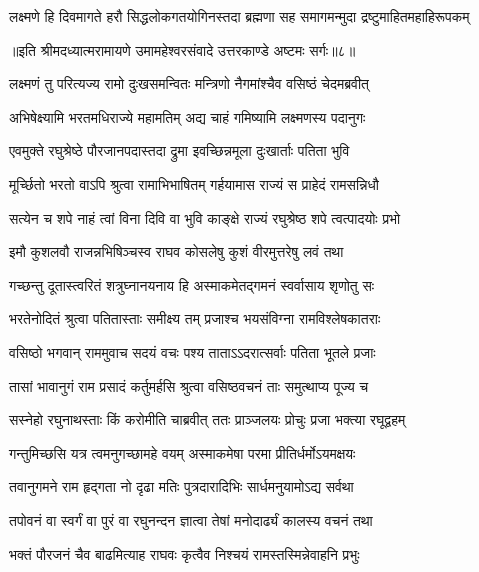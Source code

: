 \twolineshloka
{लक्ष्मणे हि दिवमागते हरौ सिद्धलोकगतयोगिनस्तदा}
{ब्रह्मणा सह समागमन्मुदा द्रष्टुमाहितमहाहिरूपकम्} %

{॥इति श्रीमदध्यात्मरामायणे उमामहेश्वरसंवादे उत्तरकाण्डे अष्टमः
सर्गः॥८॥}





\twolineshloka
{लक्ष्मणं तु परित्यज्य रामो दुःखसमन्वितः}
{मन्त्रिणो नैगमांश्चैव वसिष्ठं चेदमब्रवीत्} %

\twolineshloka
{अभिषेक्ष्यामि भरतमधिराज्ये महामतिम्}
{अद्य चाहं गमिष्यामि लक्ष्मणस्य पदानुगः} %

\twolineshloka
{एवमुक्ते रघुश्रेष्ठे पौरजानपदास्तदा}
{द्रुमा इवच्छिन्नमूला दुःखार्ताः पतिता भुवि} %

\twolineshloka
{मूर्च्छितो भरतो वाऽपि श्रुत्वा रामाभिभाषितम्}
{गर्हयामास राज्यं स प्राहेदं रामसन्निधौ} %

\twolineshloka
{सत्येन च शपे नाहं त्वां विना दिवि वा भुवि}
{काङ्क्षे राज्यं रघुश्रेष्ठ शपे त्वत्पादयोः प्रभो} %

\twolineshloka
{इमौ कुशलवौ राजन्नभिषिञ्चस्व राघव}
{कोसलेषु कुशं वीरमुत्तरेषु लवं तथा} %

\twolineshloka
{गच्छन्तु दूतास्त्वरितं शत्रुघ्नानयनाय हि}
{अस्माकमेतद्गमनं स्वर्वासाय शृणोतु सः} %

\twolineshloka
{भरतेनोदितं श्रुत्वा पतितास्ताः समीक्ष्य तम्}
{प्रजाश्च भयसंविग्ना रामविश्लेषकातराः} %

\twolineshloka
{वसिष्ठो भगवान् राममुवाच सदयं वचः}
{पश्य ताताऽऽदरात्सर्वाः पतिता भूतले प्रजाः} %

\twolineshloka
{तासां भावानुगं राम प्रसादं कर्तुमर्हसि}
{श्रुत्वा वसिष्ठवचनं ताः समुत्थाप्य पूज्य च} %

\twolineshloka
{सस्नेहो रघुनाथस्ताः किं करोमीति चाब्रवीत्}
{ततः प्राञ्जलयः प्रोचुः प्रजा भक्त्या रघूद्वहम्} %

\twolineshloka
{गन्तुमिच्छसि यत्र त्वमनुगच्छामहे वयम्}
{अस्माकमेषा परमा प्रीतिर्धर्मोऽयमक्षयः} %

\twolineshloka
{तवानुगमने राम हृद्गता नो दृढा मतिः}
{पुत्रदारादिभिः सार्धमनुयामोऽद्य सर्वथा} %

\twolineshloka
{तपोवनं वा स्वर्गं वा पुरं वा रघुनन्दन}
{ज्ञात्वा तेषां मनोदार्ढ्यं कालस्य वचनं तथा} %

\twolineshloka
{भक्तं पौरजनं चैव बाढमित्याह राघवः}
{कृत्वैव निश्चयं रामस्तस्मिन्नेवाहनि प्रभुः} %

